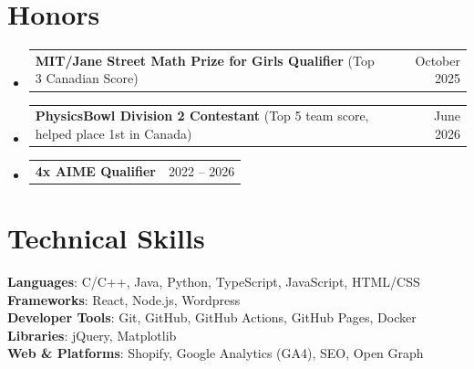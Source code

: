 \documentclass[letterpaper,11pt]{article}
\makeatletter
\newcommand{\resumeProjectHeading}[2]{
    \item
    \begin{tabular*}{0.97\textwidth}{l@{\extracolsep{\fill}}r}
      \small#1 & #2 \\
    \end{tabular*}\vspace{-7pt}
}
\newcommand{\resumeSubHeadingListStart}{\begin{itemize}[leftmargin=0.15in, label={}]}
\newcommand{\resumeSubHeadingListEnd}{\end{itemize}}
\makeatother
\begin{document}
\section{Honors}
    \resumeSubHeadingListStart
      \resumeProjectHeading
          {\textbf{MIT/Jane Street Math Prize for Girls Qualifier} (Top 3 Canadian Score)}{October 2025}
      \resumeProjectHeading
          {\textbf{PhysicsBowl Division 2 Contestant} (Top 5 team score, helped place 1st in Canada)}{June 2026}
      \resumeProjectHeading
          {\textbf{4x AIME Qualifier}}{2022 -- 2026}
    \resumeSubHeadingListEnd

%
\section{Technical Skills}
 \begin{itemize}[leftmargin=0.15in, label={}]
    \small{\item{
     \textbf{Languages}{: C/C++, Java, Python, TypeScript, JavaScript, HTML/CSS} \\
     \textbf{Frameworks}{: React, Node.js, Wordpress} \\
     \textbf{Developer Tools}{: Git, GitHub, GitHub Actions, GitHub Pages, Docker} \\
     \textbf{Libraries}{: jQuery, Matplotlib} \\
     \textbf{Web \& Platforms}{: Shopify, Google Analytics (GA4), SEO, Open Graph}
    }}
 \end{itemize}


\end{document}
